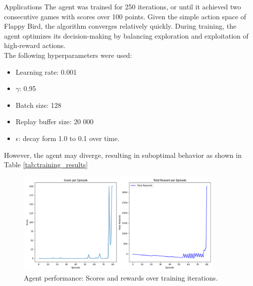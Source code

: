 \documentclass[final,hyperref={pdfpagelabels=false}]{beamer}
\begin{document}
\begin{frame}
\begin{cvprlposter}

\cvprlpostermiddle

\begin{block}{Applications}
The agent was trained for 250 iterations, or until it achieved two consecutive games with scores over 100 points. Given the simple action space of Flappy Bird, the algorithm converges relatively quickly. During training, the agent optimizes its decision-making by balancing exploration and exploitation of high-reward actions. \\

The following hyperparameters were used: 
\begin{itemize}
    \item Learning rate: 0.001
    \item \(\gamma\): 0.95
    \item Batch size: 128
    \item Replay buffer size: 20 000
    \item \(\epsilon\): decay form 1.0 to 0.1 over time.
\end{itemize}
However, the agent may diverge, resulting in suboptimal behavior as shown in Table \ref{tab:training_results}

\begin{figure}[h!]
    \centering
    \includegraphics[width=0.9\textwidth, height=0.5\textwidth]{res/figure1.png}
    \caption{Agent performance: Scores and rewards over training iterations.}
    \label{fig:nice-graph} 
\end{figure}


\end{block}
\end{cvprlposter}
\end{frame}
\end{document}
